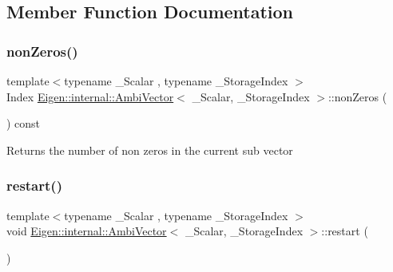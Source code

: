 \subsection{Member Function Documentation}
\mbox{\label{class_eigen_1_1internal_1_1_ambi_vector_ae0b137e95f52dea2320c16c379d27e74}} 
\subsubsection{\texorpdfstring{nonZeros()}{nonZeros()}}
{\footnotesize\ttfamily template$<$typename \+\_\+\+Scalar , typename \+\_\+\+Storage\+Index $>$ \\
Index \mbox{\hyperlink{class_eigen_1_1internal_1_1_ambi_vector}{Eigen\+::internal\+::\+Ambi\+Vector}}$<$ \+\_\+\+Scalar, \+\_\+\+Storage\+Index $>$\+::non\+Zeros (\begin{DoxyParamCaption}{ }\end{DoxyParamCaption}) const}

\begin{DoxyReturn}{Returns}
the number of non zeros in the current sub vector 
\end{DoxyReturn}
\mbox{\label{class_eigen_1_1internal_1_1_ambi_vector_a518fc22cdfa37e5340350e2a69fa8f1a}} 
\subsubsection{\texorpdfstring{restart()}{restart()}}
{\footnotesize\ttfamily template$<$typename \+\_\+\+Scalar , typename \+\_\+\+Storage\+Index $>$ \\
void \mbox{\hyperlink{class_eigen_1_1internal_1_1_ambi_vector}{Eigen\+::internal\+::\+Ambi\+Vector}}$<$ \+\_\+\+Scalar, \+\_\+\+Storage\+Index $>$\+::restart (\begin{DoxyParamCaption}{ }\end{DoxyParamCaption})}

